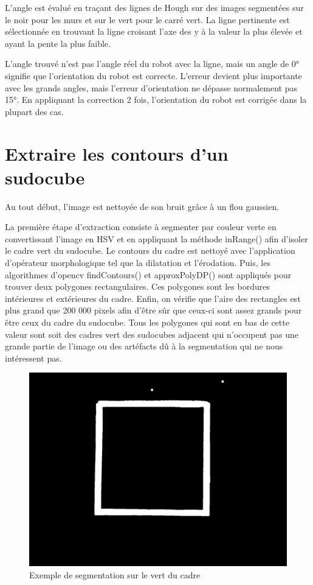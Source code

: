 L'angle est évalué en traçant des lignes de Hough sur des images segmentées sur le noir pour les murs et sur le vert pour le carré vert. La ligne pertinente est sélectionnée en trouvant la ligne croisant l'axe des y à la valeur la plus élevée et ayant la pente la plus faible. 

L'angle trouvé n'est pas l'angle réel du robot avec la ligne, mais un angle de 0° signifie que l'orientation du robot est correcte. L'erreur devient plus importante avec les grands angles, mais l'erreur d'orientation ne dépasse normalement pas 15°. En appliquant la correction 2 fois, l'orientation du robot est corrigée dans la plupart des cas.

\section{Extraire les contours d'un sudocube}

Au tout début, l'image est nettoyée de son bruit grâce à un flou gaussien.

La première étape d'extraction consiste à segmenter par couleur verte en convertissant l'image en HSV et en appliquant la méthode inRange() afin d'isoler le cadre vert du sudocube. Le contours du cadre est nettoyé avec l'application d'opérateur morphologique tel que la dilatation et l'érodation. Puis, les algorithmes d'opencv findContours() et approxPolyDP() sont appliqués pour trouver deux polygones rectangulaires. Ces polygones sont les bordures intérieures et extérieures du cadre. Enfin, on vérifie que l'aire des rectangles est plus grand que 200 000 pixels afin d'être sûr que ceux-ci sont assez grands pour être ceux du cadre du sudocube. Tous les polygones qui sont en bas de cette valeur sont soit des cadres vert des sudocubes adjacent qui n'occupent pas une grande partie de l'image ou des artéfacts dû à la segmentation qui ne nous intéressent pas.

\begin{figure}[h!]
\centering
\includegraphics[scale=0.20]{fig/cadreVertSegmente.jpeg}
\caption{Exemple de segmentation sur le vert du cadre}
\label{fig:segmentation_vert}
\end{figure}


